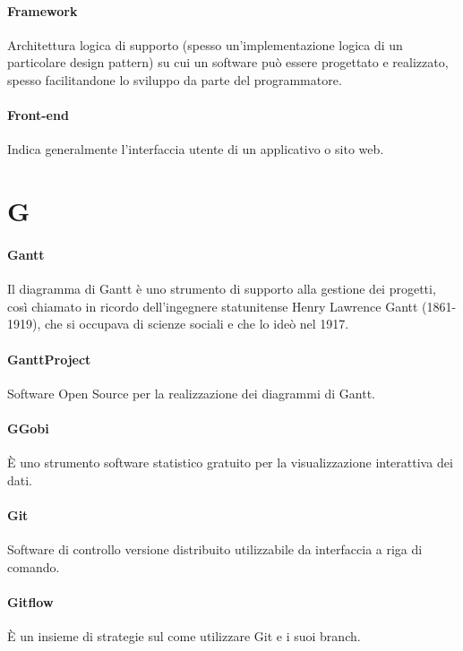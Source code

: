 \documentclass[]{article}
\begin{document}
	\paragraph*{Framework}
	Architettura logica di supporto (spesso un'implementazione logica di un particolare design pattern) su cui un software può essere progettato e realizzato, spesso facilitandone lo sviluppo da parte del programmatore.
	
	\paragraph*{Front-end}
	Indica generalmente l'interfaccia utente di un applicativo o sito web.
	
	\newpage

	\section*{G}
	
	\paragraph*{Gantt}
	Il diagramma di Gantt è uno strumento di supporto alla gestione dei progetti, così chiamato in ricordo dell'ingegnere statunitense Henry Lawrence Gantt (1861-1919), che si occupava di scienze sociali e che lo ideò nel 1917.
	
	\paragraph*{GanttProject}
	Software Open Source per la realizzazione dei diagrammi di Gantt.
	
	\paragraph*{GGobi}
	È uno strumento software statistico gratuito per la visualizzazione interattiva dei dati.
	
	\paragraph*{Git}
	Software di controllo versione distribuito utilizzabile da interfaccia a riga di comando.
	
	\paragraph*{Gitflow}
	È un insieme di strategie sul come utilizzare Git e i suoi branch.
	
\end{document}
